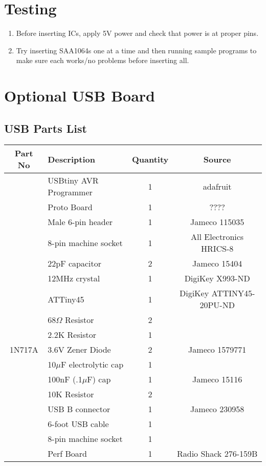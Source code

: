 \documentclass[11pt]{article}
\begin{document}
\section{Testing}
\begin{enumerate}
\item Before inserting ICs, apply 5V power and check that power is
      at proper pins.
\item Try inserting SAA1064s one at a time and then running sample
      programs to make sure each works/no problems before inserting all.
\end{enumerate}

\pagebreak




\section{Optional USB Board}


\subsection{USB Parts List}

\begin{tabular}{|c|l|c|c|}
\hline
Part No   &  Description    &  Quantity    &   Source \\
\hline
\hline
          &  USBtiny AVR Programmer  & 1  & adafruit\\ %
\hline
\hline
          &  Proto Board             & 1  & ????    \\ %
          &  Male 6-pin header       & 1  & Jameco 115035 \\ %
          &  8-pin machine socket    & 1  & All Electronics HRICS-8\\
\hline
\hline
          &  22pF capacitor          & 2  & Jameco 15404 \\ %
          &  12MHz crystal           & 1  & DigiKey X993-ND \\
          &  ATTiny45                & 1  & DigiKey ATTINY45-20PU-ND \\
          &  68$\Omega$ Resistor          & 2  & \\
          &  2.2K Resistor           & 1  & \\
1N717A    &  3.6V Zener Diode        & 2  & Jameco 1579771\\
          &  10$\mu$F electrolytic cap   & 1  & \\
          &  100nF (.1$\mu$F) cap        & 1  & Jameco 15116\\
          &  10K Resistor            & 2  & \\
          &  USB B connector         & 1  & Jameco 230958\\
          &  6-foot USB cable        & 1  & \\
          &  8-pin machine socket    & 1  & \\
          &  Perf Board              & 1  & Radio Shack 276-159B \\
\hline

\hline
\end{tabular}
\end{document}
